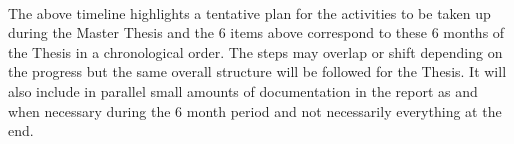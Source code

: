 \documentclass{article}
\begin{document}
\noindent
\\The above timeline highlights a tentative plan for the activities to be taken up during the Master Thesis and the $6$ items above correspond to these $6$ months of the Thesis in a chronological order. The steps may overlap or shift depending on the progress but the same overall structure will be followed for the Thesis. It will also include in parallel small amounts of documentation in the report as and when necessary during the $6$ month period and not necessarily everything at the end.\par
\end{document}
